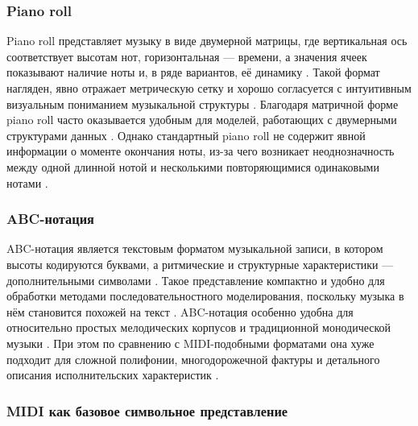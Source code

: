 \documentclass[a4paper,12pt]{extarticle}
\begin{document}
\subsubsection{Piano roll}
\label{subsubsec:pianoroll}

Piano roll представляет музыку в виде двумерной матрицы, где вертикальная ось соответствует высотам нот, горизонтальная --- времени, а значения ячеек показывают наличие ноты и, в ряде вариантов, её динамику \cite{duan2025recent,ji2023symbolic,briot2017deep}. 
Такой формат нагляден, явно отражает метрическую сетку и хорошо согласуется с интуитивным визуальным пониманием музыкальной структуры \cite{duan2025recent,ji2023symbolic}. 
Благодаря матричной форме piano roll часто оказывается удобным для моделей, работающих с двумерными структурами данных \cite{briot2017deep,ji2023symbolic}. 
Однако стандартный piano roll не содержит явной информации о моменте окончания ноты, из-за чего возникает неоднозначность между одной длинной нотой и несколькими повторяющимися одинаковыми нотами \cite{duan2025recent}. 

\subsubsection{ABC-нотация}
\label{subsubsec:abc}

ABC-нотация является текстовым форматом музыкальной записи, в котором высоты кодируются буквами, а ритмические и структурные характеристики --- дополнительными символами \cite{duan2025recent,ji2023symbolic}. 
Такое представление компактно и удобно для обработки методами последовательностного моделирования, поскольку музыка в нём становится похожей на текст \cite{briot2017deep,ji2023symbolic}. 
ABC-нотация особенно удобна для относительно простых мелодических корпусов и традиционной монодической музыки \cite{duan2025recent,ji2023symbolic}. 
При этом по сравнению с MIDI-подобными форматами она хуже подходит для сложной полифонии, многодорожечной фактуры и детального описания исполнительских характеристик \cite{duan2025recent,ji2023symbolic}. 

\subsubsection{MIDI как базовое символьное представление}
\label{subsubsec:midi}
\end{document}
